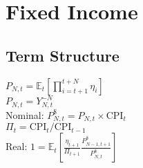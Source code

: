 \section{Fixed Income}
	\subsection*{Term Structure}
	$P_{N,t} = \mathbb{E}_{t}\left[\prod_{i = t + 1}^{t + N}\eta_{i}\right]$\\
	$P_{N,t} = Y_{N,t}^{-N}$\\
	Nominal: $P_{N,t}^{\$} = P_{N,t}\times\text{CPI}_{t}$\\
	$\Pi_{t} = \text{CPI}_{t}/\text{CPI}_{t - 1}$\\
	Real: $1 = \mathbb{E}_{t}\left[\frac{\eta_{t + 1}}{\Pi_{t + 1}}\frac{P_{N-1,t+1}^{\$}}{P_{N,t}^{\$}}\right]$
	